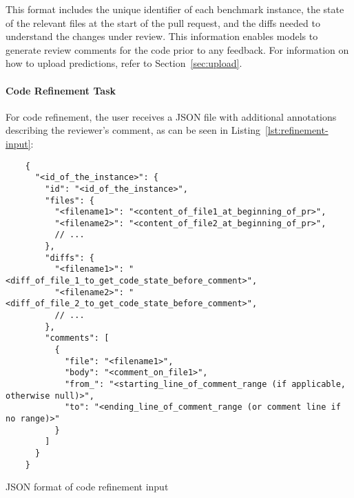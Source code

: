 This format includes the unique identifier of each benchmark instance, the state of the relevant
files at the start of the pull request, and the diffs needed to understand the changes under review.
This information enables models to generate review comments for the code prior to any feedback. For
information on how to upload predictions, refer to Section~\ref{sec:upload}.

\paragraph{Code Refinement Task}

For code refinement, the user receives a JSON file with additional annotations describing the
reviewer’s comment, as can be seen in Listing~\ref{lst:refinement-input}:

\begin{listing}[!ht]
	\begin{verbatim}
    {
      "<id_of_the_instance>": {
        "id": "<id_of_the_instance>",
        "files": {
          "<filename1>": "<content_of_file1_at_beginning_of_pr>",
          "<filename2>": "<content_of_file2_at_beginning_of_pr>",
          // ...
        },
        "diffs": {
          "<filename1>": "<diff_of_file_1_to_get_code_state_before_comment>",
          "<filename2>": "<diff_of_file_2_to_get_code_state_before_comment>",
          // ...
        },
        "comments": [
          {
            "file": "<filename1>",
            "body": "<comment_on_file1>",
            "from_": "<starting_line_of_comment_range (if applicable, otherwise null)>",
            "to": "<ending_line_of_comment_range (or comment line if no range)>"
          }
        ]
      }
    }
    \end{verbatim}
	\caption{JSON format of code refinement input}
	\label{lst:refinement-input}
\end{listing}

